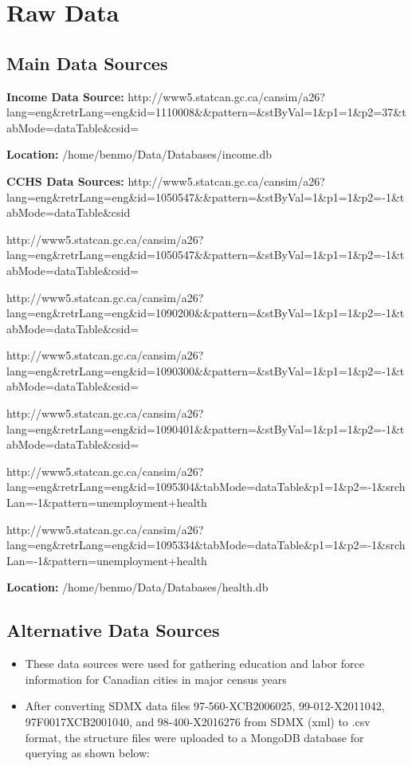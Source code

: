 \documentclass[11pt]{article}
\begin{document}
    \hypertarget{raw-data}{%
\section{Raw Data}\label{raw-data}}

    \hypertarget{main-data-sources}{%
\subsection{Main Data Sources}\label{main-data-sources}}

    \textbf{Income Data Source:}
http://www5.statcan.gc.ca/cansim/a26?lang=eng\&retrLang=eng\&id=1110008\&\&pattern=\&stByVal=1\&p1=1\&p2=37\&tabMode=dataTable\&csid=

\textbf{Location:} /home/benmo/Data/Databases/income.db

\textbf{CCHS Data Sources:}
http://www5.statcan.gc.ca/cansim/a26?lang=eng\&retrLang=eng\&id=1050547\&\&pattern=\&stByVal=1\&p1=1\&p2=-1\&tabMode=dataTable\&csid

http://www5.statcan.gc.ca/cansim/a26?lang=eng\&retrLang=eng\&id=1050547\&\&pattern=\&stByVal=1\&p1=1\&p2=-1\&tabMode=dataTable\&csid=

http://www5.statcan.gc.ca/cansim/a26?lang=eng\&retrLang=eng\&id=1090200\&\&pattern=\&stByVal=1\&p1=1\&p2=-1\&tabMode=dataTable\&csid=

http://www5.statcan.gc.ca/cansim/a26?lang=eng\&retrLang=eng\&id=1090300\&\&pattern=\&stByVal=1\&p1=1\&p2=-1\&tabMode=dataTable\&csid=

http://www5.statcan.gc.ca/cansim/a26?lang=eng\&retrLang=eng\&id=1090401\&\&pattern=\&stByVal=1\&p1=1\&p2=-1\&tabMode=dataTable\&csid=

http://www5.statcan.gc.ca/cansim/a26?lang=eng\&retrLang=eng\&id=1095304\&tabMode=dataTable\&p1=1\&p2=-1\&srchLan=-1\&pattern=unemployment+health

http://www5.statcan.gc.ca/cansim/a26?lang=eng\&retrLang=eng\&id=1095334\&tabMode=dataTable\&p1=1\&p2=-1\&srchLan=-1\&pattern=unemployment+health

\textbf{Location:} /home/benmo/Data/Databases/health.db

    \hypertarget{alternative-data-sources}{%
\subsection{Alternative Data Sources}\label{alternative-data-sources}}

    \begin{itemize}
\item
  These data sources were used for gathering education and labor force
  information for Canadian cities in major census years
\item
  After converting SDMX data files 97-560-XCB2006025, 99-012-X2011042,
  97F0017XCB2001040, and 98-400-X2016276 from SDMX (xml) to .csv format,
  the structure files were uploaded to a MongoDB database for querying
  as shown below:
\end{itemize}
\end{document}
